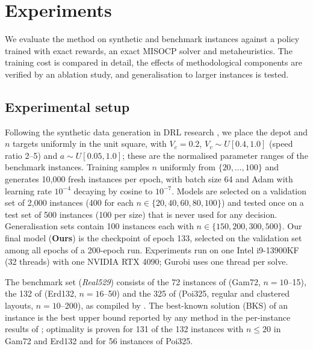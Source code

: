 \documentclass[preprint,review,12pt,authoryear]{elsarticle}
\begin{document}
\section{Experiments}\label{sec:exp}

We evaluate the method on synthetic and benchmark instances against a policy trained with exact rewards, an exact
MISOCP solver and metaheuristics. The training cost is compared in detail, the effects of methodological
components are verified by an ablation study, and generalisation to larger instances is tested.

\subsection{Experimental setup}\label{sec:setup}
Following the synthetic data generation in DRL research \citep{kool2019attention,kwon2020pomo}, we place the depot
and $n$ targets uniformly in the unit square, with $V_c=0.2$, $V_v\sim U[0.4,1.0]$ (speed ratio 2--5) and
$a\sim U[0.05,1.0]$; these are the normalised parameter ranges of the benchmark instances. Training samples $n$
uniformly from $\{20,\dots,100\}$ and generates 10{,}000 fresh instances per epoch, with batch size 64 and Adam
with learning rate $10^{-4}$ decaying by cosine to $10^{-7}$. Models are selected on a validation set of 2{,}000
instances (400 for each $n\in\{20,40,60,80,100\}$) and tested once on a test set of 500 instances (100 per size)
that is never used for any decision. Generalisation sets contain 100 instances each with
$n\in\{150,200,300,500\}$. Our final model (\textbf{Ours}) is the checkpoint of epoch 133, selected on the
validation set among all epochs of a 200-epoch run. Experiments run on one Intel i9-13900KF (32 threads) with one
NVIDIA RTX 4090; Gurobi uses one thread per solve.

The benchmark set (\emph{Real529}) consists of the 72 instances of \citet{gambella2018exact} (Gam72, $n=10$--15),
the 132 of \citet{erdogan2021exact} (Erd132, $n=16$--50) and the 325 of \citet{poikonen2020mothership} (Poi325,
regular and clustered layouts, $n=10$--200), as compiled by \citet{li2025exact}. The best-known solution (BKS) of
an instance is the best upper bound reported by any method in the per-instance results of \citet{li2025exact};
optimality is proven for 131 of the 132 instances with $n\le20$ in Gam72 and Erd132 and for 56 instances of Poi325.
\end{document}
